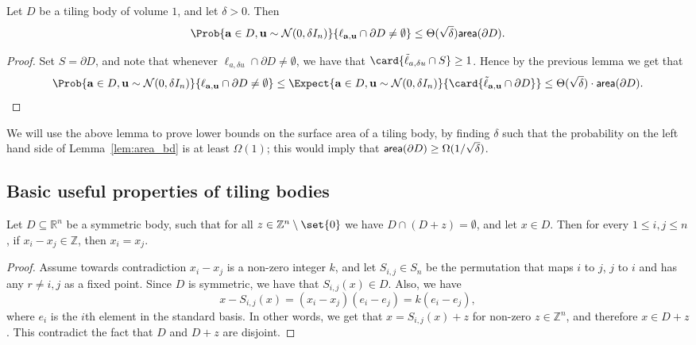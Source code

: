 \begin{lemma}\label{lem:area_bd}
  Let $D$ be a tiling body of volume $1$, and let $\delta>0$. Then
  \[
    \Prob{{\bf a}\in D, {\bf u}\sim\mathcal{N}(0,\delta I_n)}{\ell_{{\bf a},{\bf u}}\cap \partial D\neq \emptyset} \leq \Theta(\sqrt{\delta}) {\sf area}(\partial D).
  \]
\end{lemma}
\begin{proof}
  Set $S = \partial D$, and note that whenever $\ell_{a,\delta u}\cap \partial D\neq \emptyset$, we have that $\card{\tilde{\ell}_{a,\delta u}\cap S}\geq 1$.
  Hence by the previous lemma we get that
  \[
  \Prob{{\bf a}\in D, {\bf u}\sim\mathcal{N}(0,\delta I_n)}{\ell_{{\bf a},{\bf u}}\cap \partial D\neq \emptyset}
  \leq
  \Expect{{\bf a}\in D, {\bf u}\sim\mathcal{N}(0,\delta I_n)}{\card{\tilde{\ell}_{{\bf a},{\bf u}}\cap \partial D}}
  \leq  \Theta(\sqrt{\delta}) \cdot {\sf area}(\partial D).
  \qedhere
  \]
\end{proof}
We will use the above lemma to prove lower bounds on the surface area of a tiling body, by finding $\delta$ such that
the probability on the left hand side of Lemma~\ref{lem:area_bd} is at least $\Omega(1)$; this would imply that
${\sf area}(\partial D)\geq \Omega(1/\sqrt{\delta})$.

\subsection{Basic useful properties of tiling bodies}
\begin{lemma}\label{lem:diff}
  Let $D\subseteq \mathbb{R}^n$ be a symmetric body, such that for all $z\in\mathbb{Z}^n\setminus\set{0}$
  we have $D\cap (D+z)  = \emptyset$, and let $x\in D$. Then for every $1\leq i,j\leq n$,
  if $x_i - x_j \in \mathbb{Z}$, then $x_i = x_j$.
\end{lemma}
\begin{proof}
  Assume towards contradiction $x_i - x_j$ is a non-zero integer $k$, and let $S_{i,j}\in S_n$ be the permutation that
  maps $i$ to $j$, $j$ to $i$ and has any $r\neq i,j$ as a fixed point. Since $D$ is symmetric, we have
  that $S_{i,j}(x)\in D$. Also, we have
  \[
    x - S_{i,j}(x) = (x_i - x_j) (e_i - e_j) = k(e_i-e_j),
  \]
  where $e_i$ is the $i$th element in the standard basis. In other words, we get that $x = S_{i,j}(x) + z$ for non-zero $z\in \mathbb{Z}^n$,
  and therefore $x\in D + z$. This contradict the fact that $D$ and $D+z$ are disjoint.
\end{proof}

